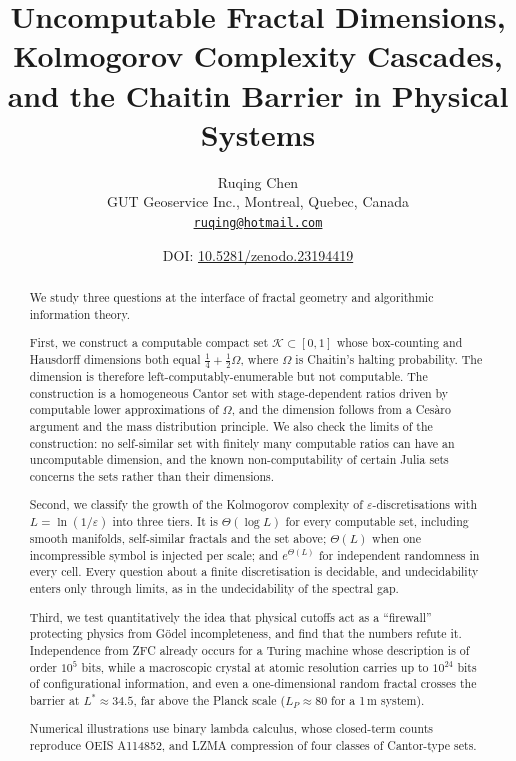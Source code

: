 \documentclass[11pt]{article}
\title{Uncomputable Fractal Dimensions,\\ Kolmogorov Complexity Cascades,\\ and the Chaitin Barrier in Physical Systems}
\author{Ruqing Chen\\[2pt]
\small GUT Geoservice Inc., Montreal, Quebec, Canada\\
\small \href{mailto:ruqing@hotmail.com}{\texttt{ruqing@hotmail.com}}}
\date{\small DOI: \href{https://doi.org/10.5281/zenodo.23194419}{10.5281/zenodo.23194419}}
\theoremstyle{definition}\newtheorem{definition}{Definition}[section]
\theoremstyle{remark}\newtheorem*{remark}{Remark}
\begin{document}
\maketitle

\begin{abstract}
We study three questions at the interface of fractal geometry and algorithmic information theory.

First, we construct a computable compact set $\mathcal K\subset[0,1]$ whose box-counting and Hausdorff
dimensions both equal $\frac14+\frac12\Omega$, where $\Omega$ is Chaitin's halting probability. The dimension is
therefore left-computably-enumerable but not computable. The construction is a homogeneous Cantor set
with stage-dependent ratios driven by computable lower approximations of $\Omega$, and the dimension follows from
a Ces\`aro argument and the mass distribution principle. We also check the limits of the construction: no
self-similar set with finitely many computable ratios can have an uncomputable dimension, and the known
non-computability of certain Julia sets concerns the sets rather than their dimensions.

Second, we classify the growth of the Kolmogorov complexity of $\varepsilon$-discretisations with
$L=\ln(1/\varepsilon)$ into three tiers. It is $\Theta(\log L)$ for every computable set, including smooth
manifolds, self-similar fractals and the set above; $\Theta(L)$ when one incompressible symbol is injected per
scale; and $e^{\Theta(L)}$ for independent randomness in every cell. Every question about a finite
discretisation is decidable, and undecidability enters only through limits, as in the undecidability of the
spectral gap.

Third, we test quantitatively the idea that physical cutoffs act as a ``firewall'' protecting physics from
G\"odel incompleteness, and find that the numbers refute it. Independence from ZFC already occurs for a
Turing machine whose description is of order $10^5$ bits, while a macroscopic crystal at atomic resolution
carries up to $10^{24}$ bits of configurational information, and even a one-dimensional random fractal
crosses the barrier at $L^*\approx34.5$, far above the Planck scale ($L_P\approx80$ for a 1\,m system).

Numerical illustrations use binary lambda calculus, whose closed-term counts reproduce OEIS A114852, and
LZMA compression of four classes of Cantor-type sets.
\end{abstract}

\tableofcontents
\end{document}
